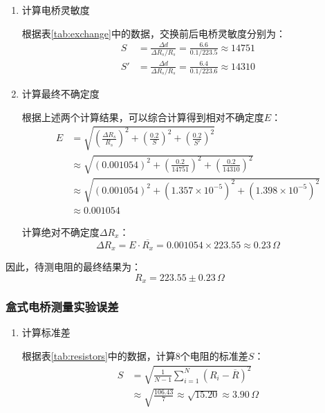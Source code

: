 \documentclass[]{../template/Report}%
\begin{document}
\begin{fullreportonly}
\begin{enumerate}
    \item 计算电桥灵敏度
    
    根据表\ref{tab:exchange}中的数据，交换前后电桥灵敏度分别为：
    \begin{align*}
        S &= \frac{\Delta d}{\Delta R_s / R_s} = \frac{6.6}{0.1 / 223.5} \approx 14751 \\
        S' &= \frac{\Delta d}{\Delta R_s / R_s} = \frac{6.4}{0.1 / 223.6} \approx 14310
    \end{align*}

    \item 计算最终不确定度
        
    根据上述两个计算结果，可以综合计算得到相对不确定度$E$：
    \begin{align*}
        E &= \sqrt{\left(\frac{\Delta R_s}{R_s}\right)^2 + \left(\frac{0.2}{S}\right)^2 + \left(\frac{0.2}{S'}\right)^2} \\
          &\approx \sqrt{(0.001054)^2 + \left(\frac{0.2}{14751}\right)^2 + \left(\frac{0.2}{14310}\right)^2} \\
          &\approx \sqrt{(0.001054)^2 + (1.357 \times 10^{-5})^2 + (1.398 \times 10^{-5})^2} \\
          &\approx 0.001054
    \end{align*}
    
    计算绝对不确定度$\Delta R_x$：
    \begin{equation}
        \Delta R_x = E \cdot \overline{R_x} = 0.001054 \times 223.55 \approx 0.23\,\Omega
    \end{equation}

\end{enumerate}    
因此，待测电阻的最终结果为：
    \begin{equation}
        \boxed{R_x = 223.55 \pm 0.23\,\Omega}
    \end{equation}

\subsubsection{盒式电桥测量实验误差}
    
\begin{enumerate}
    \item 计算标准差
    
根据表\ref{tab:resistors}中的数据，计算8个电阻的标准差$S$：
\begin{align*}
    S &= \sqrt{\frac{1}{N-1} \sum_{i=1}^{N} (R_i - \overline{R})^2} \\
      &\approx \sqrt{\frac{106.43}{7}} \approx \sqrt{15.20} \approx 3.90\,\Omega
\end{align*}


\end{enumerate}
\end{fullreportonly}
\end{document}
